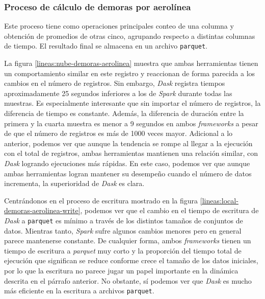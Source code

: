 \subsubsection{Proceso de cálculo de demoras por aerolínea}

Este proceso tiene como operaciones principales conteo de una columna y obtención de promedios de otras cinco, agrupando respecto a distintas columnas de tiempo. El resultado final se almacena en un archivo \texttt{parquet}.

La figura \ref{lineas:nube-demoras-aerolinea} muestra que ambas herramientas tienen un comportamiento similar en este registro y reaccionan de forma parecida a los cambios en el número de registros. Sin embargo, \textit{Dask} registra tiempos aproximadamente 25 segundos inferiores a los de \textit{Spark} durante todas las muestras. Es especialmente interesante que sin importar el número de registros, la diferencia de tiempo es constante. Además, la diferencia de duración entre la primera y la cuarta muestra es menor a 9 segundos en ambos \textit{frameworks} a pesar de que el número de registros es más de 1000 veces mayor. Adicional a lo anterior, podemos ver que aunque la tendencia se rompe al llegar a la ejecución con el total de registros, ambas herramientas mantienen una relación similar, con \textit{Dask} logrando ejecuciones más rápidas. En este caso, podemos ver que aunque ambas herramientas logran mantener su desempeño cuando el número de datos incrementa, la superioridad de \textit{Dask} es clara.

Centrándonos en el proceso de escritura mostrado en la figura \ref{lineas:local-demoras-aerolinea-write}, podemos ver que el cambio en el tiempo de escritura de \textit{Dask} a \texttt{parquet} es mínimo a través de los distintos tamaños de conjuntos de datos. Mientras tanto, \textit{Spark} sufre algunos cambios menores pero en general parece mantenerse constante. De cualquier forma, ambos \textit{frameworks} tienen un tiempo de escritura a \textit{parquet} muy corto y la proporción del tiempo total de ejecución que significan se reduce conforme crece el tamaño de los datos iniciales, por lo que la escritura no parece jugar un papel importante en la dinámica descrita en el párrafo anterior. No obstante, sí podemos ver que \textit{Dask} es mucho más eficiente en la escritura a archivos \texttt{parquet}.

